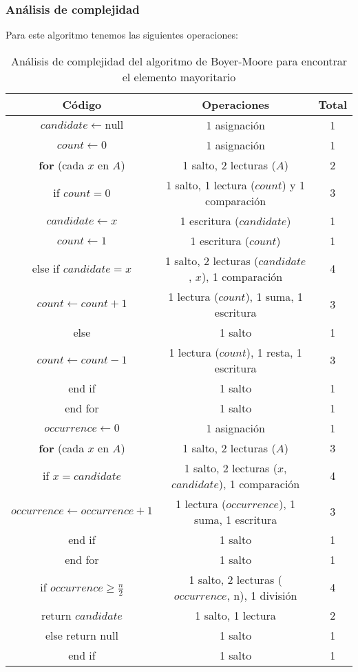 \subsubsection*{Análisis de complejidad}
Para este algoritmo tenemos las siguientes operaciones:
\begin{table}[H]
    \centering
    \begin{tabular}{|c|c|c|}
        \hline
        \textbf{Código} & \textbf{Operaciones} & \textbf{Total} \\
        \hline
        $candidate \gets \text{null}$ & 1 asignación & 1 \\
        \hline
        $count \gets 0$ & 1 asignación & 1 \\
        \hline
        \textbf{for} (cada $x$ en $A$) & 1 salto, 2 lecturas ($A$) & 2 \\
        \hline
        if $count = 0$ & 1 salto, 1 lectura ($count$) y 1 comparación & 3 \\
        \hline
        $candidate \gets x$ & 1 escritura ($candidate$) & 1 \\
        \hline
        $count \gets 1$ & 1 escritura ($count$) & 1 \\
        \hline
        else if $candidate = x$ & 1 salto, 2 lecturas ($candidate$, $x$), 1 comparación & 4 \\
        \hline
        $count \gets count + 1$ & 1 lectura ($count$), 1 suma, 1 escritura & 3 \\
        \hline
        else & 1 salto & 1 \\
        \hline
        $count \gets count - 1$ & 1 lectura ($count$), 1 resta, 1 escritura & 3 \\
        \hline
        end if & 1 salto & 1 \\
        \hline
        end for & 1 salto & 1 \\
        \hline
        $occurrence \gets 0$ & 1 asignación & 1 \\
        \hline
        \textbf{for} (cada $x$ en $A$) & 1 salto, 2 lecturas ($A$) & 3 \\
        \hline
        if $x = candidate$ & 1 salto, 2 lecturas ($x$, $candidate$), 1 comparación & 4 \\
        \hline
        $occurrence \gets occurrence + 1$ & 1 lectura ($occurrence$), 1 suma, 1 escritura & 3 \\
        \hline
        end if & 1 salto & 1 \\
        \hline
        end for & 1 salto & 1 \\
        \hline
        if $occurrence \geq \frac{n}{2}$ & 1 salto, 2 lecturas ($occurrence$, n), 1 división & 4 \\
        \hline
        return $candidate$ & 1 salto, 1 lectura & 2 \\
        \hline
        else return $\text{null}$ & 1 salto & 1 \\
        \hline
        end if & 1 salto & 1 \\
        \hline
    \end{tabular}
    \caption{Análisis de complejidad del algoritmo de Boyer-Moore para encontrar el elemento mayoritario}
    \label{tabla:boyer-moore}
\end{table}
